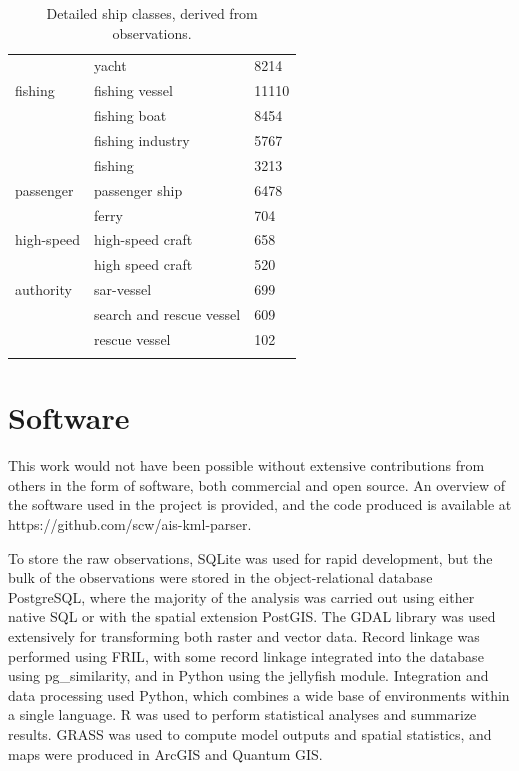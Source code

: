 \begin{longtable}{l|l|l}
           & yacht & 8214 \\
  fishing & fishing vessel & 11110 \\
          & fishing boat & 8454 \\
          & fishing industry & 5767 \\
          & fishing & 3213 \\
  passenger & passenger ship & 6478 \\
            & ferry & 704 \\
  high-speed & high-speed craft & 658 \\
             & high speed craft & 520 \\
  authority & sar-vessel & 699 \\
            & search and rescue vessel & 609 \\
            & rescue vessel & 102 \\
  \caption[Detailed ship classes]{Detailed ship classes, derived from observations.}
  \label{table:ship-class-breakdown}
\end{longtable}

\chapter{Software}
\label{sec:software}


This work would not have been possible without extensive contributions from others in the form of software, both commercial and open source. An overview of the software used in the project is provided, and the code produced is available at https://github.com/scw/ais-kml-parser. 

To store the raw observations, \textsf{SQLite} was used for rapid development, but the bulk of the observations were stored in the object-relational database \textsf{PostgreSQL}, where the majority of the analysis was carried out using either native SQL or with the spatial extension \textsf{PostGIS}. The \textsf{GDAL} library was used extensively for transforming both raster and vector data. Record linkage was performed using \textsf{FRIL}, with some record linkage integrated into the database using \textsf{pg\_similarity}, and in \textsf{Python} using the \textsf{jellyfish} module. Integration and data processing used \textsf{Python}, which combines a wide base of environments within a single language. \textsf{R} was used to perform statistical analyses and summarize results. \textsf{GRASS} was used to compute model outputs and spatial statistics, and maps were produced in \textsf{ArcGIS} and \textsf{Quantum GIS}.

